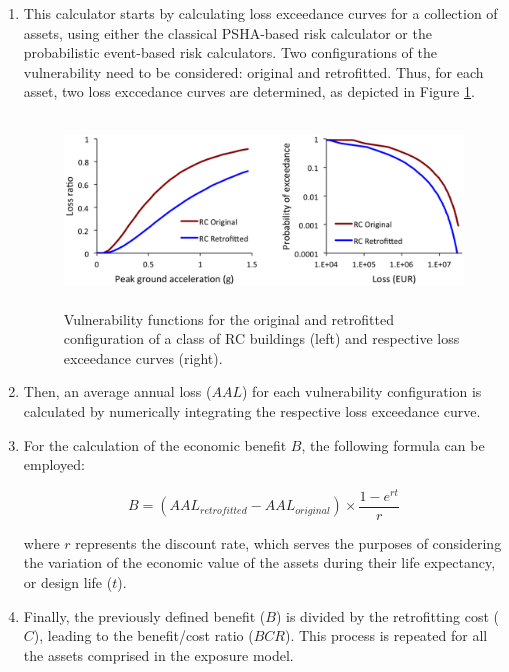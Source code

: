 \begin{enumerate}
\item This calculator starts by calculating loss exceedance curves for a collection of \glspl{asset}, using either the classical PSHA-based risk calculator or the probabilistic event-based risk calculators. Two configurations of the vulnerability need to be considered: original and retrofitted. Thus, for each \gls{asset}, two loss exccedance curves are determined, as depicted in Figure \ref{fig:VulLosscurve}.

\begin{figure}[ht]
\centering
\includegraphics[width=12cm,height=5cm]{./figures/risk/VulnerabilityLosscurve.eps}
\caption{Vulnerability functions for the original and retrofitted configuration of a class of RC buildings (left) and respective loss exceedance curves (right).}
\label{fig:VulLosscurve}
\end{figure}

\item Then, an average annual loss ($AAL$) for each vulnerability configuration is calculated by numerically integrating the respective loss exceedance curve.  

\item For the calculation of the economic benefit $B$, the following formula can be employed:

\begin{equation}
B=(AAL_{retrofitted}-AAL_{original})\times\frac{1-e^{rt}}{r}
\end{equation}

where $r$ represents the discount rate, which serves the purposes of considering the variation of the economic value of the \glspl{asset} during their life expectancy, or design life ($t$).

\item Finally, the previously defined benefit ($B$) is divided by the retrofitting cost ($C$), leading to the benefit/cost ratio ($BCR$). This process is repeated for all the \glspl{asset} comprised in the \gls{exposure model}.

\end{enumerate}

